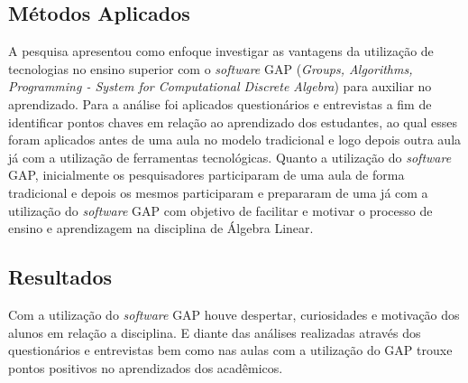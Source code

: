 \subsection{Métodos Aplicados}
\noindent A pesquisa apresentou como enfoque investigar as vantagens da utilização de tecnologias no ensino superior com o \textit{software} GAP (\textit{Groups, Algorithms, Programming - System for Computational Discrete Algebra}) para auxiliar no aprendizado. Para a análise foi aplicados questionários e entrevistas a fim de identificar pontos chaves em relação ao aprendizado dos estudantes, ao qual esses foram aplicados antes de uma aula no modelo tradicional e logo depois outra aula já com a utilização de ferramentas tecnológicas. Quanto a utilização do \textit{software} GAP, inicialmente os pesquisadores participaram de uma aula de forma tradicional e depois os mesmos participaram e prepararam de uma já com a utilização do \textit{software} GAP com objetivo de facilitar e motivar o processo de ensino e aprendizagem na disciplina de Álgebra Linear.

\subsection{Resultados}
\noindent Com a utilização do \textit{software} GAP houve despertar, curiosidades e motivação dos alunos em relação a disciplina. E diante das análises realizadas através dos questionários e entrevistas bem como nas aulas com a utilização do GAP trouxe pontos positivos no aprendizados dos acadêmicos.